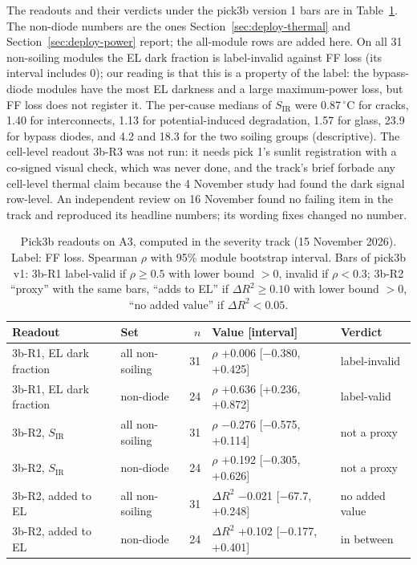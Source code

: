 The readouts and their verdicts under the pick3b version 1 bars are in Table~\ref{tab:thermal-3b}. The non-diode numbers are the ones
Section~\ref{sec:deploy-thermal} and Section~\ref{sec:deploy-power} report; the all-module rows are added here. On all 31 non-soiling
modules the EL dark fraction is label-invalid against FF loss (its interval includes 0); our reading is that this is a property of the label: the bypass-diode modules have
the most EL darkness and a large maximum-power loss, but FF loss does not register it. The per-cause medians of $S_\mathrm{IR}$ were
0.87\,$^{\circ}$C for cracks, 1.40 for interconnects, 1.13 for potential-induced degradation, 1.57 for glass, 23.9 for bypass diodes,
and 4.2 and 18.3 for the two soiling groups (descriptive). The cell-level readout 3b-R3 was not run: it needs pick 1's sunlit
registration with a co-signed visual check, which was never done, and the track's brief forbade any cell-level thermal claim because the
4 November study had found the dark signal row-level. An independent review on 16 November found no failing item in the track and
reproduced its headline numbers; its wording fixes changed no number.

\begin{table}[htbp]
\centering\small
\caption{Pick3b readouts on A3, computed in the severity track (15 November 2026). Label: FF loss. Spearman $\rho$ with 95\% module
bootstrap interval. Bars of pick3b v1: 3b-R1 label-valid if $\rho \geq 0.5$ with lower bound $> 0$, invalid if $\rho < 0.3$; 3b-R2
``proxy'' with the same bars, ``adds to EL'' if $\Delta R^2 \geq 0.10$ with lower bound $> 0$, ``no added value'' if $\Delta R^2 < 0.05$.}
\label{tab:thermal-3b}
\begin{tabular}{@{}llrll@{}}
\toprule
Readout & Set & $n$ & Value [interval] & Verdict \\
\midrule
3b-R1, EL dark fraction & all non-soiling & 31 & $\rho$ +0.006 [$-$0.380, +0.425] & label-invalid \\
3b-R1, EL dark fraction & non-diode & 24 & $\rho$ +0.636 [+0.236, +0.872] & label-valid \\
3b-R2, $S_\mathrm{IR}$ & all non-soiling & 31 & $\rho$ $-$0.276 [$-$0.575, +0.114] & not a proxy \\
3b-R2, $S_\mathrm{IR}$ & non-diode & 24 & $\rho$ +0.192 [$-$0.305, +0.626] & not a proxy \\
3b-R2, added to EL & all non-soiling & 31 & $\Delta R^2$ $-$0.021 [$-$67.7, +0.248] & no added value \\
3b-R2, added to EL & non-diode & 24 & $\Delta R^2$ +0.102 [$-$0.177, +0.401] & in between \\
\bottomrule
\end{tabular}
\end{table}

